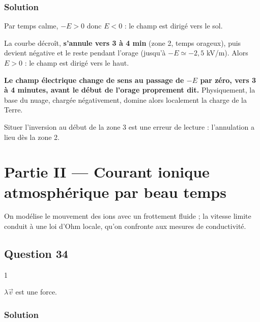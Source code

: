 \documentclass[11pt,a4paper]{article}
\begin{document}
\hypertarget{solution-32}{%
\subsubsection{Solution}\label{solution-32}}

Par temps calme, \(-E>0\) donc \(E<0\) : le champ est dirigé vers le sol.

La courbe décroît, \textbf{s'annule vers 3 à 4 min} (zone 2, temps orageux), puis devient négative et le reste pendant l'orage (jusqu'à \(-E\simeq-2{,}5\) kV/m). Alors \(E>0\) : le champ est dirigé vers le haut.

\textbf{Le champ électrique change de sens au passage de \(-E\) par zéro, vers 3 à 4 minutes, avant le début de l'orage proprement dit.} Physiquement, la base du nuage, chargée négativement, domine alors localement la charge de la Terre.

\begin{piege}

Situer l'inversion au début de la zone 3 est une erreur de lecture : l'annulation a lieu dès la zone 2.

\end{piege}

\hypertarget{partie-ii-courant-ionique-atmosphuxe9rique-par-beau-temps}{%
\section{Partie II --- Courant ionique atmosphérique par beau temps}\label{partie-ii-courant-ionique-atmosphuxe9rique-par-beau-temps}}

On modélise le mouvement des ions avec un frottement fluide ; la vitesse limite conduit à une loi d'Ohm locale, qu'on confronte aux mesures de conductivité.

\hypertarget{question-34}{%
\subsection{Question 34}\label{question-34}}

\begin{indication}{1}

\(\lambda\vec v\) est une force.

\end{indication}

\hypertarget{solution-33}{%
\subsubsection{Solution}\label{solution-33}}
\end{document}
